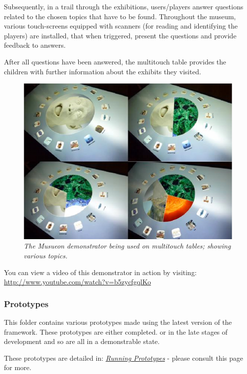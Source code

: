 \documentclass[letterpaper,10pt,english]{sphinxmanual}
\begin{document}
Subsequently, in a trail through the exhibitions, users/players answer questions related to the chosen topics that have to be found. Throughout the museum, various touch-screens equipped with scanners (for reading and identifying the players) are installed, that when
triggered, present the questions and provide feedback to answers.

After all questions have been answered, the multitouch table provides the children with further information about the exhibits they visited.
\begin{figure}[htbp]
\centering
\capstart

\includegraphics{puppy-musueon.png}
\caption{\emph{The Musueon demonstrator being used on multitouch tables; showing various topics.}}\end{figure}

You can view a video of this demonstrator in action by visiting: \href{http://www.youtube.com/watch?v=b5zycfgqlKo}{http://www.youtube.com/watch?v=b5zycfgqlKo}


\subsubsection{Prototypes}
\label{repo:prototypes}
This folder contains various prototypes made using the latest version of the framework. These prototypes are either completed. or in the late stages of development and so are all in a demonstrable state.

These prototypes are detailed in: {\hyperref[prototypes:prototypes]{\emph{Running Prototypes}}} - please consult this page for more.
\end{document}
